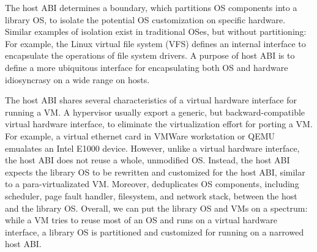 The host ABI 
determines a boundary, which partitions OS components %
into a library OS,
to isolate the potential OS customization on specific hardware. %
Similar examples of isolation
exist in traditional OSes, but without partitioning:
For example, the Linux virtual file system (VFS) defines an internal interface
to encapsulate the operations
of file system drivers.
A purpose of host ABI
is to define a more ubiquitous interface
for encapsulating both OS and hardware idiosyncrasy on a wide range on hosts.




The host ABI shares several characteristics of a virtual hardware interface for running a VM.
A hypervisor usually export a generic, but backward-compatible
virtual hardware interface,
to eliminate the virtualization effort for porting a VM.
For example, a virtual ethernet card in VMWare workstation or QEMU
emualates an Intel E1000 device.
However, unlike a virtual hardware interface, the host ABI does not reuse a whole, unmodified OS.
Instead, the host ABI expects the library OS
to be rewritten and
customized for the host ABI,
similar to a 
para-virtualizated VM.
Moreover, \graphene{} deduplicates OS components,
including scheduler, page fault handler, filesystem, and network stack,
between the host and the library OS.
Overall, we can put the \graphene{} library OS and VMs on a spectrum:
while a VM tries to reuse most of an OS and runs on a virtual hardware interface,
a library OS
is partitioned and customized
for running on a narrowed host ABI.




